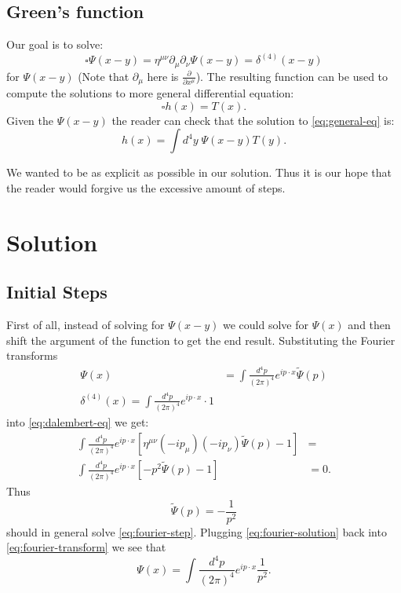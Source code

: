 \documentclass[aps,prd,final,twocolumn,floats,floatfix,nofootinbib,10pt]{revtex4-1}
\begin{document}
\subsection{Green's function}

Our goal is to solve:
\begin{equation}\label{eq:dalembert-eq}
\square \Psi(x - y) = \eta^{\mu\nu} \partial_\mu \partial_\nu \Psi(x - y) = \delta^{(4)} (x - y)
\end{equation}
for $\Psi(x - y)$ (Note that $\partial_\mu$ here is $\frac{\partial}{\partial x^\mu}$).
The resulting function can be used to compute the solutions to more general differential equation:
\begin{equation}\label{eq:general-eq}
\square h(x) = T(x).
\end{equation}
Given the $\Psi(x - y)$ the reader can check that the solution to \eqref{eq:general-eq} is:
\begin{equation}
h(x) = \int d^4y \; \Psi(x - y) T(y).
\end{equation}

We wanted to be as explicit as possible in our solution. Thus it is our hope that the reader would forgive us the
excessive amount of steps.

\section{Solution}

\subsection{Initial Steps}

First of all, instead of solving for $\Psi(x - y)$ we could solve for $\Psi(x)$ and then shift the argument of the function
to get the end result. Substituting the Fourier transforms
\begin{align}\label{eq:fourier-transform}
\Psi(x) & = \int \frac{d^4p}{(2 \pi)^4} e^{i p \cdot x} \tilde{\Psi}(p) \\
\delta^{(4)} (x) = \int \frac{d^4p}{(2 \pi)^4} e^{i p \cdot x} \cdot 1
\end{align}
into \eqref{eq:dalembert-eq} we get:
\begin{align}\label{eq:fourier-step}
\int \frac{d^4p}{(2 \pi)^4} e^{i p \cdot x} \left[ \eta^{\mu\nu} (-i p_\mu) (-i p_\nu) \tilde{\Psi}(p) - 1 \right] & = \\
\int \frac{d^4p}{(2 \pi)^4} e^{i p \cdot x} \left[ -p^2 \tilde{\Psi}(p) - 1 \right] & = 0.
\end{align}
Thus
\begin{equation}\label{eq:fourier-solution}
\tilde{\Psi}(p) = -\frac{1}{p^2}
\end{equation}
should in general solve \eqref{eq:fourier-step}. Plugging \eqref{eq:fourier-solution} back into
\eqref{eq:fourier-transform} we see that
\begin{equation}\label{eq:complex-integral}
\Psi(x) = \int \frac{d^4p}{(2 \pi)^4} e^{i p \cdot x} \frac{1}{p^2}.
\end{equation}
\end{document}
